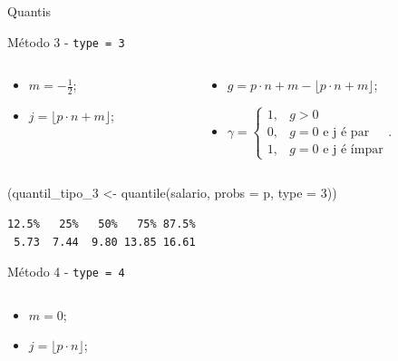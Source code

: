 \documentclass[
  10pt,
  ignorenonframetext,
]{beamer}
\newenvironment{Shaded}{\begin{snugshade}}{\end{snugshade}}
\newcommand{\AttributeTok}[1]{\textcolor[rgb]{0.40,0.45,0.13}{#1}}
\newcommand{\DecValTok}[1]{\textcolor[rgb]{0.68,0.00,0.00}{#1}}
\newcommand{\FunctionTok}[1]{\textcolor[rgb]{0.28,0.35,0.67}{#1}}
\newcommand{\NormalTok}[1]{\textcolor[rgb]{0.00,0.23,0.31}{#1}}
\newcommand{\OtherTok}[1]{\textcolor[rgb]{0.00,0.23,0.31}{#1}}
\providecommand{\tightlist}{%
  \setlength{\itemsep}{0pt}\setlength{\parskip}{0pt}}\usepackage{longtable,booktabs,array}
\begin{document}
\begin{frame}[fragile]{Quantis}
\protect\hypertarget{quantis-3}{}
\begin{block}{Método 3 - \texttt{type\ =\ 3}}
\protect\hypertarget{muxe9todo-3---type-3}{}
\begin{columns}[T]
\begin{column}{0.5\textwidth}
\begin{itemize}
\tightlist
\item
  \(m=-\frac{1}{2}\);
\item
  \(j=\lfloor p\cdot n + m \rfloor\);
\end{itemize}
\end{column}

\begin{column}{0.5\textwidth}
\begin{itemize}
\tightlist
\item
  \(g = p\cdot n + m- \lfloor p\cdot n+m \rfloor\);
\item
  \(\gamma = \begin{cases} 1, & g > 0\\ 0,& g = 0 \text{ e j é par}\\ 1,& g = 0 \text{ e j é ímpar} \end{cases}.\)
\end{itemize}
\end{column}
\end{columns}

\begin{Shaded}
\begin{Highlighting}[]
\NormalTok{(quantil\_tipo\_3 }\OtherTok{\textless{}{-}} \FunctionTok{quantile}\NormalTok{(salario, }\AttributeTok{probs =}\NormalTok{ p, }\AttributeTok{type =} \DecValTok{3}\NormalTok{))}
\end{Highlighting}
\end{Shaded}

\begin{verbatim}
12.5%   25%   50%   75% 87.5% 
 5.73  7.44  9.80 13.85 16.61 
\end{verbatim}
\end{block}

\begin{block}{Método 4 - \texttt{type\ =\ 4}}
\protect\hypertarget{muxe9todo-4---type-4}{}
\begin{columns}[T]
\begin{column}{0.3\textwidth}
\begin{itemize}
\tightlist
\item
  \(m=0\);
\item
  \(j=\lfloor p\cdot n \rfloor\);
\end{itemize}
\end{column}


\end{columns}
\end{block}
\end{frame}
\end{document}
